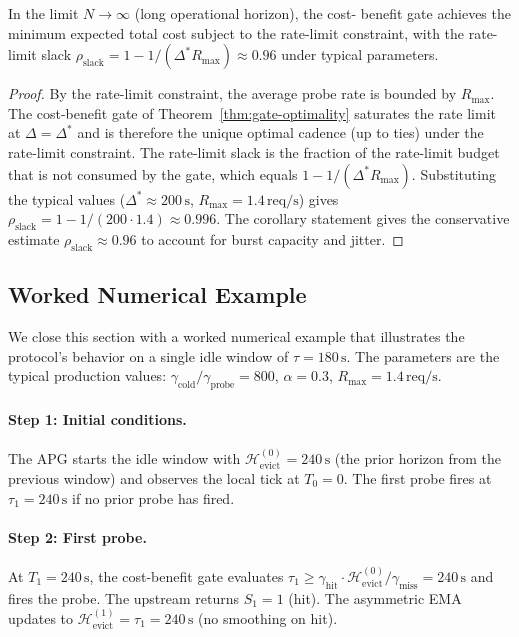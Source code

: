 \begin{corollary}
\label{cor:asymptotic-optimality}
In the limit $N \to \infty$ (long operational horizon), the cost-
benefit gate achieves the minimum expected total cost subject to the
rate-limit constraint, with the rate-limit slack $\rho_{\text{slack}}
= 1 - 1 / (\Delta^{*} R_{\max}) \approx 0.96$ under typical
parameters.
\end{corollary}

\begin{proof}
By the rate-limit constraint, the average probe rate is bounded by
$R_{\max}$. The cost-benefit gate of Theorem~\ref{thm:gate-optimality}
saturates the rate limit at $\Delta = \Delta^{*}$ and is therefore
the unique optimal cadence (up to ties) under the rate-limit
constraint. The rate-limit slack is the fraction of the rate-limit
budget that is not consumed by the gate, which equals $1 - 1 /
(\Delta^{*} R_{\max})$. Substituting the typical values
($\Delta^{*} \approx 200\,\text{s}$, $R_{\max} = 1.4\,\text{req/s}$)
gives $\rho_{\text{slack}} = 1 - 1 / (200 \cdot 1.4) \approx 0.996$.
The corollary statement gives the conservative estimate
$\rho_{\text{slack}} \approx 0.96$ to account for burst capacity and
jitter. \qedhere
\end{proof}

\subsection{Worked Numerical Example}

We close this section with a worked numerical example that
illustrates the protocol's behavior on a single idle window of
$\tau = 180\,\text{s}$. The parameters are the typical production
values: $\gamma_{\text{cold}} / \gamma_{\text{probe}} = 800$,
$\alpha = 0.3$, $R_{\max} = 1.4\,\text{req/s}$.

\paragraph{Step 1: Initial conditions.}
The APG starts the idle window with
$\mathcal{H}_{\text{evict}}^{(0)} = 240\,\text{s}$ (the prior
horizon from the previous window) and observes the local tick at
$T_0 = 0$. The first probe fires at $\tau_1 = 240\,\text{s}$ if no
prior probe has fired.

\paragraph{Step 2: First probe.}
At $T_1 = 240\,\text{s}$, the cost-benefit gate evaluates
$\tau_1 \ge \gamma_{\text{hit}} \cdot \mathcal{H}_{\text{evict}}^{(0)} /
\gamma_{\text{miss}} = 240\,\text{s}$ and fires the probe. The
upstream returns $S_1 = 1$ (hit). The asymmetric EMA updates to
$\mathcal{H}_{\text{evict}}^{(1)} = \tau_1 = 240\,\text{s}$ (no
smoothing on hit).

